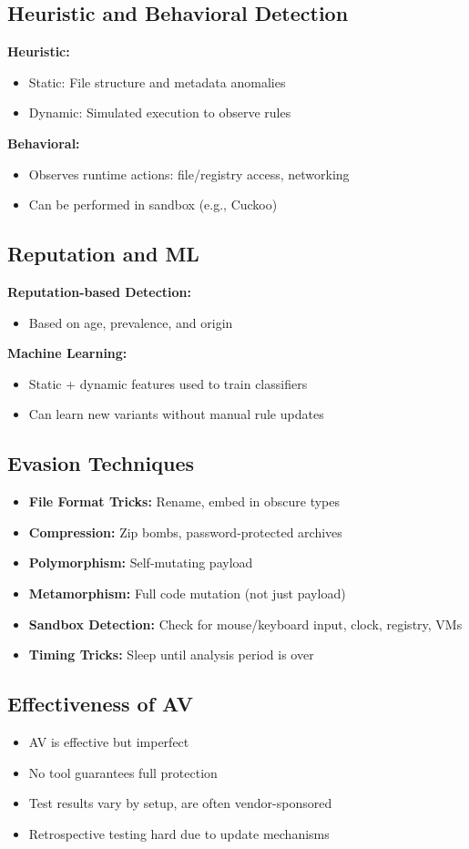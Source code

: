 \subsection{Heuristic and Behavioral Detection}
{
\textbf{Heuristic:}
\begin{itemize}[noitemsep]
  \item Static: File structure and metadata anomalies
  \item Dynamic: Simulated execution to observe rules
\end{itemize}

\textbf{Behavioral:}
\begin{itemize}[noitemsep]
  \item Observes runtime actions: file/registry access, networking
  \item Can be performed in sandbox (e.g., Cuckoo)
\end{itemize}
}

\subsection{Reputation and ML}
{
\textbf{Reputation-based Detection:}
\begin{itemize}[noitemsep]
  \item Based on age, prevalence, and origin
\end{itemize}

\textbf{Machine Learning:}
\begin{itemize}[noitemsep]
  \item Static + dynamic features used to train classifiers
  \item Can learn new variants without manual rule updates
\end{itemize}
}

\subsection{Evasion Techniques}
{
\begin{itemize}[noitemsep]
  \item \textbf{File Format Tricks:} Rename, embed in obscure types
  \item \textbf{Compression:} Zip bombs, password-protected archives
  \item \textbf{Polymorphism:} Self-mutating payload
  \item \textbf{Metamorphism:} Full code mutation (not just payload)
  \item \textbf{Sandbox Detection:} Check for mouse/keyboard input, clock, registry, VMs
  \item \textbf{Timing Tricks:} Sleep until analysis period is over
\end{itemize}
}

\subsection{Effectiveness of AV}
{
\begin{itemize}[noitemsep]
  \item AV is effective but imperfect
  \item No tool guarantees full protection
  \item Test results vary by setup, are often vendor-sponsored
  \item Retrospective testing hard due to update mechanisms
\end{itemize}
}

